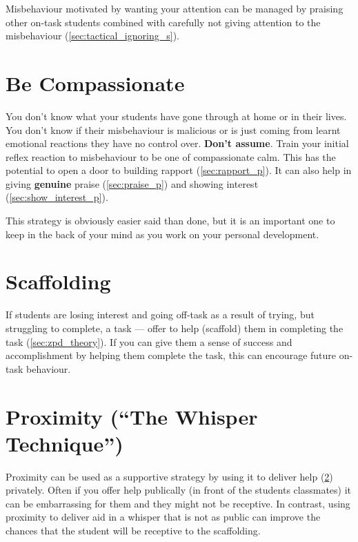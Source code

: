 \documentclass[12pt]{report}
\begin{document}
Misbehaviour motivated by wanting your attention can be managed by praising other on-task students combined with carefully not giving attention to the misbehaviour (\ref{sec:tactical_ignoring_s}).



\section{Be Compassionate}
\label{sec:compassion_s}

You don't know what your students have gone through at home or in their lives. You don't know if their misbehaviour is malicious or is just coming from learnt emotional reactions they have no control over. \textbf{Don't assume}. Train your initial reflex reaction to misbehaviour to be one of compassionate calm. This has the potential to open a door to building rapport (\ref{sec:rapport_p}). It can also help in giving \textbf{genuine} praise (\ref{sec:praise_p}) and showing interest (\ref{sec:show_interest_p}).

This strategy is obviously easier said than done, but it is an important one to keep in the back of your mind as you work on your personal development.



\section{Scaffolding}
\label{sec:scaffolding_s}

If students are losing interest and going off-task as a result of trying, but struggling to complete, a task --- offer to help (scaffold) them in completing the task (\ref{sec:zpd_theory}). If you can give them a sense of success and accomplishment by helping them complete the task, this can encourage future on-task behaviour.



\section{Proximity (``The Whisper Technique'')}
\label{sec:proximity_s}

Proximity can be used as a supportive strategy by using it to deliver help (\ref{sec:scaffolding_s}) privately. Often if you offer help publically (in front of the students classmates) it can be embarrassing for them and they might not be receptive. In contrast, using proximity to deliver aid in a whisper that is not as public can improve the chances that the student will be receptive to the scaffolding.
\end{document}
